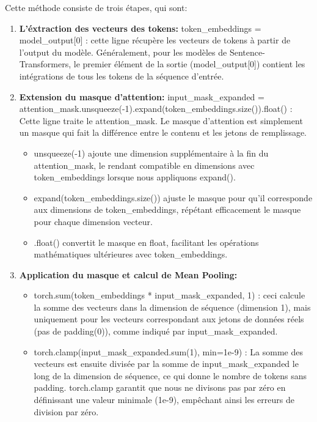 \noindent
Cette méthode consiste de trois étapes, qui sont:
\begin{enumerate}
	\item \small\textbf{L'éxtraction des vecteurs des tokens: }token\_embeddings = model\_output[0] : cette ligne récupère les vecteurs de tokens à partir de l'output du modèle. Généralement, pour les modèles de Sentence-Transformers, le premier élément de la sortie (model\_output[0]) contient les intégrations de tous les tokens de la séquence d'entrée.

	\item \small\textbf{Extension du masque d'attention: }input\_mask\_expanded = \\ attention\_mask.unsqueeze(-1).expand(token\_embeddings.size()).float() : \\ Cette ligne traite le attention\_mask. Le masque d'attention est simplement un masque qui fait la différence entre le contenu et les jetons de remplissage.

	      \begin{itemize}
		      \item unsqueeze(-1) ajoute une dimension supplémentaire à la fin du attention\_mask, le rendant compatible en dimensions avec token\_embeddings lorsque nous appliquons expand().
		      \item expand(token\_embeddings.size()) ajuste le masque pour qu'il corresponde aux dimensions de token\_embeddings, répétant efficacement le masque pour chaque dimension vecteur.
		      \item .float() convertit le masque en float, facilitant les opérations mathématiques ultérieures avec token\_embeddings.
	      \end{itemize}

	\item \small\textbf{Application du masque et calcul de Mean Pooling: }
	      \begin{itemize}
		      \item torch.sum(token\_embeddings * input\_mask\_expanded, 1) : ceci calcule la somme des vecteurs dans la dimension de séquence (dimension 1), mais uniquement pour les vecteurs correspondant aux jetons de données réels (pas de padding(0)), comme indiqué par input\_mask\_expanded.
		      \item torch.clamp(input\_mask\_expanded.sum(1), min=1e-9) : La somme des vecteurs est ensuite divisée par la somme de input\_mask\_expanded le long de la dimension de séquence, ce qui donne le nombre de tokens sans padding. torch.clamp garantit que nous ne divisons pas par zéro en définissant une valeur minimale (1e-9), empêchant ainsi les erreurs de division par zéro.
	      \end{itemize}
\end{enumerate}

